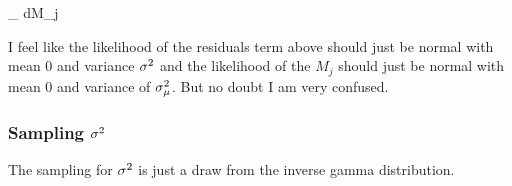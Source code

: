 \documentclass[12pt]{article}
\begin{document}
\beqn
{} \propto \underbrace{\int \ldots \int}_{}   dM_j
\eeqn

I feel like the likelihood of the residuals term above should just be normal with mean 0 and variance $\sigma^2$ and the likelihood of the $M_j$ should just be normal with mean 0 and variance of $\sigma^2_\mu$. But no doubt I am very confused.

%
%
%
%
%
%
%
%
%
%




\subsubsection{Sampling $\sigma^2$}

The sampling for $\sigma^2$ is just a draw from the inverse gamma distribution. 
\end{document}
